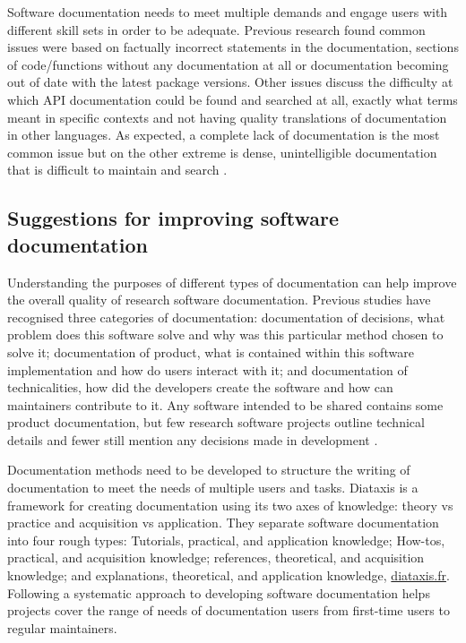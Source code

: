 \documentclass[../main.tex]{subfiles}
\begin{document}
Software documentation needs to meet multiple demands and engage users with different skill sets in order to be adequate.
Previous research found common issues were based on factually incorrect statements in the documentation, sections of code/functions without any documentation at all or documentation becoming out of date with the latest package versions.
Other issues discuss the difficulty at which API documentation could be found and searched at all, exactly what terms meant in specific contexts and not having quality translations of documentation in other languages.
As expected, a complete lack of documentation is the most common issue but on the other extreme is dense, unintelligible documentation that is difficult to maintain and search \parencite{Aghajani2019}.

\subsection{Suggestions for improving software documentation}

Understanding the purposes of different types of documentation can help improve the overall quality of research software documentation.
Previous studies have recognised three categories of documentation: documentation of decisions, what problem does this software solve and why was this particular method chosen to solve it; documentation of product, what is contained within this software implementation and how do users interact with it; and documentation of technicalities, how did the developers create the software and how can maintainers contribute to it. 
Any software intended to be shared contains some product documentation, but few research software projects outline technical details and fewer still mention any decisions made in development \parencite{Geiger2018}.

Documentation methods need to be developed to structure the writing of documentation to meet the needs of multiple users and tasks.
Diataxis is a framework for creating documentation using its two axes of knowledge: theory vs practice and acquisition vs application. 
They separate software documentation into four rough types: Tutorials, practical, and application knowledge; How-tos, practical, and acquisition knowledge; references, theoretical, and acquisition knowledge; and explanations, theoretical, and application knowledge, \href{https://diataxis.fr/}{diataxis.fr}.
Following a systematic approach to developing software documentation helps projects cover the range of needs of documentation users from first-time users to regular maintainers.
\end{document}
